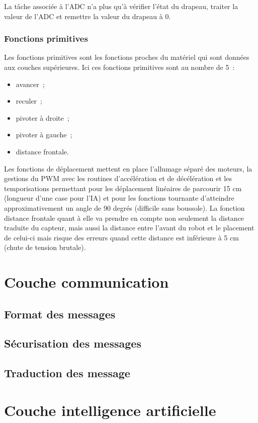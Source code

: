 \documentclass{article}
\begin{document}
La tâche associée à l'ADC n'a plus qu'à vérifier l'état du drapeau, traiter la valeur de l'ADC et remettre la valeur du drapeau à 0.

\subsubsection{Fonctions primitives}

Les fonctions primitives sont les fonctions proches du matériel qui sont données aux couches supérieures. Ici ces fonctions primitives sont au nombre de 5~: \\

\begin{itemize}
  \item avancer~;
  \item reculer~;
  \item pivoter à droite~;
  \item pivoter à gauche~;
  \item distance frontale. \\
\end{itemize}

Les fonctions de déplacement mettent en place l'allumage séparé des moteurs, la gestions du PWM avec les routines d'accélération et de décélération et les temporisations permettant pour les déplacement linéaires de parcourir 15 cm (longueur d'une case pour l'IA) et pour les fonctions tournante d'atteindre approximativement un angle de 90 degrés (difficile sans boussole). La fonction distance frontale quant à elle va prendre en compte non seulement la distance traduite du capteur, mais aussi la distance entre l'avant du robot et le placement de celui-ci mais risque des erreurs quand cette distance est inférieure à 5 cm (chute de tension brutale). 

\section{Couche communication}

\subsection{Format des messages}

\subsection{Sécurisation des messages}

\subsection{Traduction des message}

\section{Couche intelligence artificielle}
\end{document}
